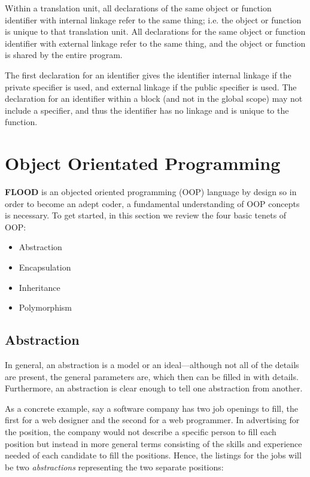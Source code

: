 \documentclass[12pt]{report}
\begin{document}
Within a translation unit, all declarations of the same object or function identifier with internal linkage refer to the same thing; i.e. the object or function is unique to that translation unit. All declarations for the same object or function identifier with external linkage refer to the same thing, and the object or function is shared by the entire program.

The first declaration for an identifier gives the identifier internal linkage if the private specifier is used,  and external linkage if the public specifier is used. The declaration for an identifier within a block (and not in the global scope) may not include a specifier, and thus the identifier has no linkage and is unique to the function. 

\section{Object Orientated Programming}

\textbf{FLOOD} is an objected oriented programming (OOP) language by design so in order to become an adept coder, a fundamental understanding of OOP concepts is necessary. To get started, in this section we review the four basic tenets of OOP:
\begin{itemize}
\setlength{\itemsep}{1pt}
\item Abstraction
\item Encapsulation
\item Inheritance
\item Polymorphism
\end{itemize}

\subsection{Abstraction}

In general, an abstraction is a model or an ideal---although not all of the details are present, the general parameters are, which then can be filled in with details. Furthermore, an abstraction is clear enough to tell one abstraction from another. 

As a concrete example, say a software company has two job openings to fill, the first for a web designer and the second for a web programmer. In advertising for the position, the company would not describe a specific person to fill each position but instead in more general terms consisting of the skills and experience needed of each candidate to fill the positions. Hence, the listings for the jobs will be two \textit{abstractions} representing the two separate positions:
\end{document}
